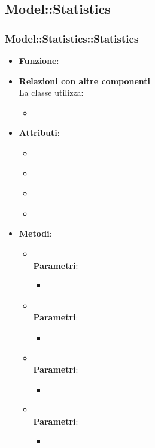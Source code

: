 \subsection{Model::Statistics}
\subsubsection{Model::Statistics::Statistics}
\begin{itemize}
\item\textbf{Funzione}:
\item\textbf{Relazioni con altre componenti}\\
La classe utilizza:
	\begin{itemize}
		\item
	\end{itemize}
\item\textbf{Attributi}:
	\begin{itemize}
		\item\code{}\\
		\item\code{}\\
		\item\code{}\\
		\item\code{}\\
	\end{itemize}
\item\textbf{Metodi}:
	\begin{itemize}
		\item\code{}\\
		\textbf{Parametri}:
			\begin{itemize}
				\item\code{}\\
			\end{itemize}
		\item\code{}\\
		\textbf{Parametri}:
			\begin{itemize}
				\item\code{}\\
			\end{itemize}
		\item\code{}\\
		\textbf{Parametri}:
			\begin{itemize}
				\item\code{}\\
			\end{itemize}
		\item\code{}\\
		\textbf{Parametri}:
			\begin{itemize}
				\item\code{}\\
			\end{itemize}
	\end{itemize}
\end{itemize}

